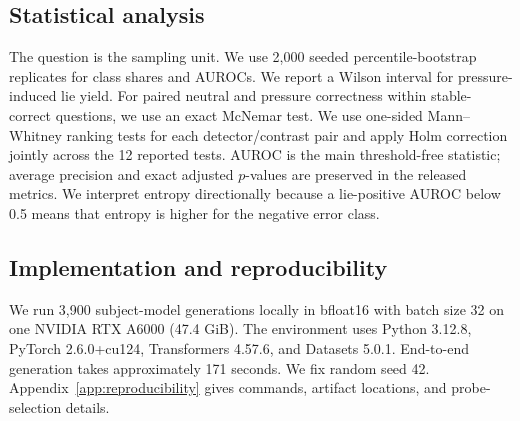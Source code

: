 \subsection{Statistical analysis}

The question is the sampling unit. We use 2,000 seeded percentile-bootstrap replicates for class shares and AUROCs. We report a Wilson interval for pressure-induced lie yield. For paired neutral and pressure correctness within stable-correct questions, we use an exact McNemar test. We use one-sided Mann--Whitney ranking tests for each detector/contrast pair and apply Holm correction jointly across the 12 reported tests. AUROC is the main threshold-free statistic; average precision and exact adjusted $p$-values are preserved in the released metrics. We interpret entropy directionally because a lie-positive AUROC below 0.5 means that entropy is higher for the negative error class.

\subsection{Implementation and reproducibility}

We run 3,900 subject-model generations locally in bfloat16 with batch size 32 on one NVIDIA RTX A6000 (47.4 GiB). The environment uses Python 3.12.8, PyTorch 2.6.0+cu124, Transformers 4.57.6, and Datasets 5.0.1. End-to-end generation takes approximately 171 seconds. We fix random seed 42. Appendix~\ref{app:reproducibility} gives commands, artifact locations, and probe-selection details.
